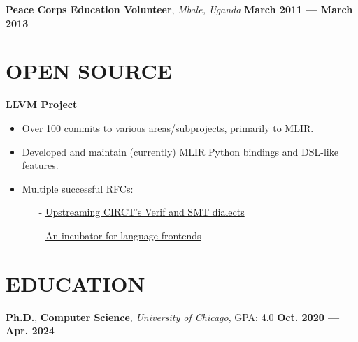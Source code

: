 \documentclass[11pt,letterpaper,roman,colorlinks,linkcolor=blue]{moderncv}
\newcommand*{\modern}{\fontfamily{qhv}\selectfont}
\newcommand{\mystyle}[1]{\textcolor{mygrey}{\modern #1}}
\newcommand{\mysectionstyle}[1]{\large\mystyle{#1}}
\begin{document}
\textbf{Peace Corps Education Volunteer}, \emph{Mbale, Uganda}
\hfill \textbf{March 2011 --- March 2013}


\section{\mysectionstyle{OPEN SOURCE}}
\textbf{LLVM Project}
\begin{itemize}
\item Over 100 \href{https://github.com/llvm/llvm-project/pulls?q=is%3Apr+author%3Amakslevental+is%3Aclosed}{commits} to various areas/subprojects, primarily to MLIR.
\item Developed and maintain (currently) MLIR Python bindings and DSL-like features.
\item Multiple successful RFCs:
    \begin{itemize}
      \item[-]{\small \href{https://discourse.llvm.org/t/rfc-upstreaming-circts-verif-and-smt-dialects/85299/19}{Upstreaming CIRCT’s Verif and SMT dialects}}
      \item[-]{\small \href{https://discourse.llvm.org/t/rfc-an-incubator-for-language-frontends-bindings/82832}{An incubator for language frontends}}
    \end{itemize}
\end{itemize}

\section{\mysectionstyle{EDUCATION}}

\textbf{Ph.D.}, \textbf{Computer Science}, \emph{University of Chicago}, GPA: 4.0
\hfill \textbf{Oct. 2020 --- Apr. 2024}
\end{document}
